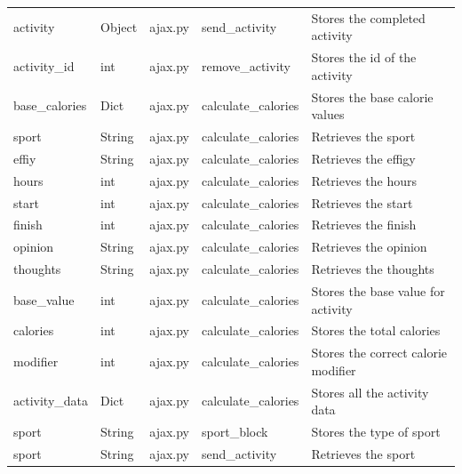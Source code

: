 \documentclass{article}[12pt,a4paper]
\begin{document}
\begin{table}[h]
\begin{tabular}{lllll}
activity          & Object        & ajax.py             & send\_activity            & Stores the completed activity           \\
activity\_id      & int           & ajax.py             & remove\_activity          & Stores the id of the activity           \\
base\_calories    & Dict          & ajax.py             & calculate\_calories       & Stores the base calorie values          \\
sport             & String        & ajax.py             & calculate\_calories       & Retrieves the sport                     \\
effiy             & String        & ajax.py             & calculate\_calories       & Retrieves the effigy                    \\
hours             & int           & ajax.py             & calculate\_calories       & Retrieves the hours                     \\
start             & int           & ajax.py             & calculate\_calories       & Retrieves the start                     \\
finish            & int           & ajax.py             & calculate\_calories       & Retrieves the finish                    \\
opinion           & String        & ajax.py             & calculate\_calories       & Retrieves the opinion                   \\
thoughts          & String        & ajax.py             & calculate\_calories       & Retrieves the thoughts                  \\
base\_value       & int           & ajax.py             & calculate\_calories       & Stores the base value for activity      \\
calories          & int           & ajax.py             & calculate\_calories       & Stores the total calories               \\
modifier          & int           & ajax.py             & calculate\_calories       & Stores the correct calorie modifier     \\
activity\_data    & Dict          & ajax.py             & calculate\_calories       & Stores all the activity data            \\
sport             & String        & ajax.py             & sport\_block              & Stores the type of sport                \\
sport             & String        & ajax.py             & send\_activity            & Retrieves the sport                     \\

\end{tabular}
\end{table}
\end{document}
